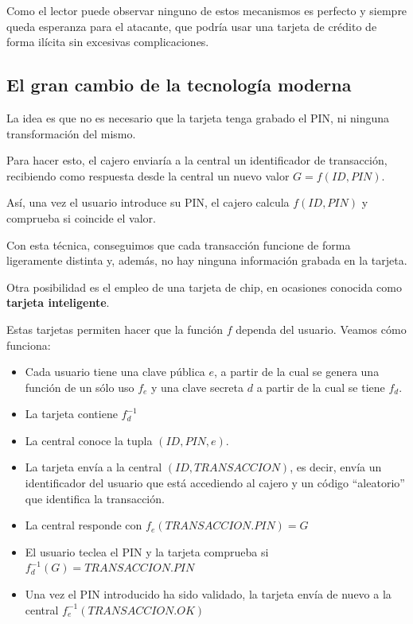 Como el lector puede observar ninguno de estos mecanismos es perfecto y siempre queda esperanza para el atacante, que podría usar una tarjeta de crédito de forma ilícita sin excesivas complicaciones.

\subsection{El gran cambio de la tecnología moderna}

La idea es que no es necesario que la tarjeta tenga grabado el PIN, ni ninguna transformación del mismo.

Para hacer esto, el cajero enviaría a la central un identificador de transacción, recibiendo como respuesta desde la central un nuevo valor $G=f(ID,PIN)$.

Así, una vez el usuario introduce su PIN, el cajero calcula $f(ID,PIN)$ y comprueba si coincide el valor.

Con esta técnica, conseguimos que cada transacción funcione de forma ligeramente distinta y, además, no hay ninguna información grabada en la tarjeta.

Otra posibilidad es el empleo de una tarjeta de chip, en ocasiones conocida como \textbf{tarjeta inteligente}. 

Estas tarjetas permiten hacer que la función $f$ dependa del usuario. Veamos cómo funciona:

\begin{itemize}
\item Cada usuario tiene una clave pública $e$, a partir de la cual se genera una función de un sólo uso $f_e$ y una clave secreta $d$ a partir de la cual se tiene $f_d$.

\item La tarjeta contiene $f^{-1}_d$ 

\item La central conoce la tupla $(ID,PIN,e)$.

\item La tarjeta envía a la central $(ID,TRANSACCION)$, es decir, envía un identificador del usuario que está accediendo al cajero y un código ``aleatorio'' que identifica la transacción.

\item La central responde con $f_e(TRANSACCION.PIN)=G$

\item El usuario teclea el PIN y la tarjeta comprueba si $f^{-1}_d(G)=TRANSACCION.PIN$

\item Una vez el PIN introducido ha sido validado, la tarjeta envía de nuevo a la central $f^{-1}_e(TRANSACCION.OK)$
\end{itemize}

